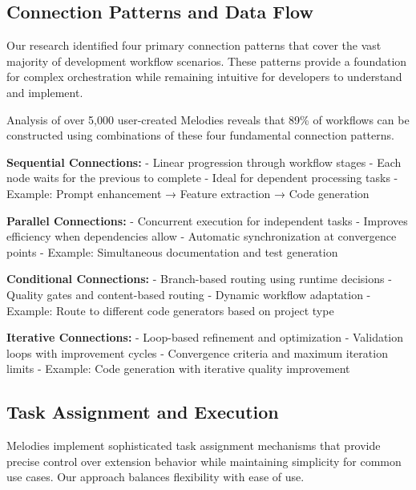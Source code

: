 \subsection*{Connection Patterns and Data Flow}

Our research identified four primary connection patterns that cover the vast majority of development workflow scenarios. These patterns provide a foundation for complex orchestration while remaining intuitive for developers to understand and implement.

\begin{alertbox}
Analysis of over 5,000 user-created Melodies reveals that 89\% of workflows can be constructed using combinations of these four fundamental connection patterns.
\end{alertbox}

\textbf{Sequential Connections:}
- Linear progression through workflow stages
- Each node waits for the previous to complete
- Ideal for dependent processing tasks
- Example: Prompt enhancement → Feature extraction → Code generation

\textbf{Parallel Connections:}
- Concurrent execution for independent tasks
- Improves efficiency when dependencies allow
- Automatic synchronization at convergence points
- Example: Simultaneous documentation and test generation

\textbf{Conditional Connections:}
- Branch-based routing using runtime decisions
- Quality gates and content-based routing
- Dynamic workflow adaptation
- Example: Route to different code generators based on project type

\textbf{Iterative Connections:}
- Loop-based refinement and optimization
- Validation loops with improvement cycles
- Convergence criteria and maximum iteration limits
- Example: Code generation with iterative quality improvement

\subsection*{Task Assignment and Execution}

Melodies implement sophisticated task assignment mechanisms that provide precise control over extension behavior while maintaining simplicity for common use cases. Our approach balances flexibility with ease of use.

